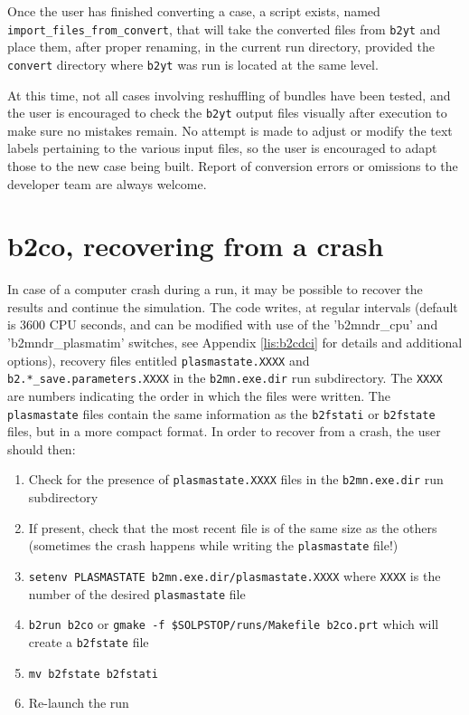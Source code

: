 \documentclass[a4paper,10pt]{report}
\begin{document}
Once the user has finished converting a case, a script exists, named
{\tt import\_files\_from\_convert},
that will take the converted files from {\tt b2yt} and
place them, after proper renaming, in the current run directory,
provided the {\tt convert} directory where {\tt b2yt}
was run is located at the same level.

At this time, not all cases involving reshuffling of bundles have been tested, and the
user is encouraged to check the {\tt b2yt} output files visually after execution to
make sure no mistakes remain. No attempt is made to adjust or modify the text labels
pertaining to the various input files, so the user is encouraged to adapt those to the
new case being built. Report of conversion errors or omissions to the developer team
are always welcome.

\newpage
\section{b2co, recovering from a crash}
\label{sec:b2co}

In case of a computer crash during a run, it may be possible to recover
the results and continue the simulation. The code writes, at regular
intervals (default is 3600 CPU seconds, and can be modified with use of the
'b2mndr\_cpu' and 'b2mndr\_plasmatim' switches, see Appendix \ref{lis:b2cdci} for details and additional options),
recovery files entitled {\tt plasmastate.XXXX} and {\tt b2.*\_save.parameters.XXXX} in the {\tt b2mn.exe.dir} run
subdirectory. The {\tt XXXX} are numbers indicating the order in which the
files were written. The {\tt plasmastate} files contain the same information as the {\tt b2fstati} or
{\tt b2fstate} files, but in a more compact format. In order to recover from
a crash, the user should then:
\begin{enumerate}
  \item Check for the presence of {\tt plasmastate.XXXX} files in the {\tt b2mn.exe.dir} run subdirectory
  \item If present, check that the most recent file is of the same size as the others (sometimes the crash happens while writing the {\tt plasmastate} file!)
  \item {\tt setenv PLASMASTATE b2mn.exe.dir/plasmastate.XXXX} where {\tt XXXX} is the number of the desired {\tt plasmastate} file
  \item {\tt b2run b2co} or {\tt gmake -f \$SOLPSTOP/runs/Makefile b2co.prt} which will create a {\tt b2fstate} file
  \item {\tt mv b2fstate b2fstati}
  \item Re-launch the run
\end{enumerate}
\end{document}
